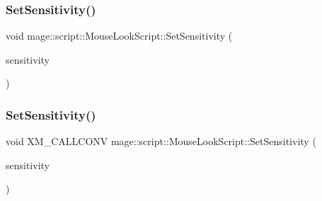\hypertarget{classmage_1_1script_1_1_mouse_look_script_adf611a4d9240e6cf338b665a2713cd9f}{}\label{classmage_1_1script_1_1_mouse_look_script_adf611a4d9240e6cf338b665a2713cd9f} 
\subsubsection{\texorpdfstring{Set\+Sensitivity()}{SetSensitivity()}\hspace{0.1cm}{\footnotesize\ttfamily [2/3]}}
{\footnotesize\ttfamily void mage\+::script\+::\+Mouse\+Look\+Script\+::\+Set\+Sensitivity (\begin{DoxyParamCaption}\item[{\hyperlink{namespacemage_aa87237ad091f5cd7da612b8523fc108f}{F32x2}}]{sensitivity }\end{DoxyParamCaption})\hspace{0.3cm}{\ttfamily [noexcept]}}

\hypertarget{classmage_1_1script_1_1_mouse_look_script_a784937d1254fe26ee28864d11956cd80}{}\label{classmage_1_1script_1_1_mouse_look_script_a784937d1254fe26ee28864d11956cd80} 
\subsubsection{\texorpdfstring{Set\+Sensitivity()}{SetSensitivity()}\hspace{0.1cm}{\footnotesize\ttfamily [3/3]}}
{\footnotesize\ttfamily void X\+M\+\_\+\+C\+A\+L\+L\+C\+O\+NV mage\+::script\+::\+Mouse\+Look\+Script\+::\+Set\+Sensitivity (\begin{DoxyParamCaption}\item[{F\+X\+M\+V\+E\+C\+T\+OR}]{sensitivity }\end{DoxyParamCaption})\hspace{0.3cm}{\ttfamily [noexcept]}}

\hypertarget{classmage_1_1script_1_1_mouse_look_script_a97c2564df1660fb9d07f9a4269a77568}{}\label{classmage_1_1script_1_1_mouse_look_script_a97c2564df1660fb9d07f9a4269a77568} 
